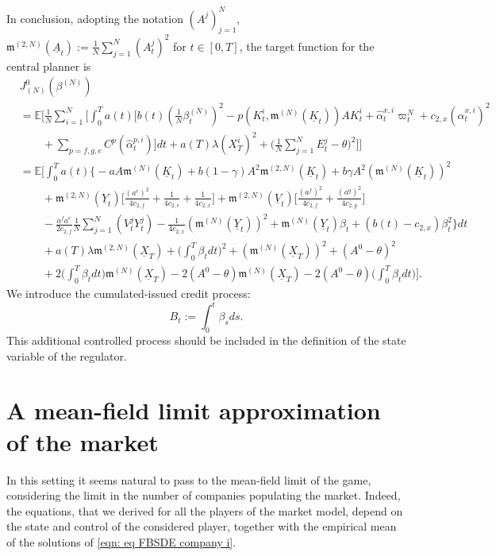 \documentclass[10pt,a4paper]{amsart}
\numberwithin{equation}{section}
\newcommand{\w}{\varpi}
\newcommand{\E}{\mathbb{E}}
\renewcommand{\hat}{\widehat}
\newcommand{\avg}{\frac{1}{N}\sum_{j = 1}^N}
\begin{document}
In conclusion, adopting the notation $(A^j)_{j= 1}^N$, $\mathfrak{m}^{(2,N)}(\underline{A}_t) := \frac{1}{N} \sum_{j =1}^N (A^j_t)^2$ for $t\in[0,T]$, the target function for the central planner is 
\begin{align*}
    &J^0_{(N)}(\beta^{(N)}) \\
    &= \E\Bigg[\frac{1}{N}\sum_{i = 1}^N \bigg[ \int_0^Ta(t)\bigg[b(t)\left(\frac{1}{N}\beta^{(N)}_t\right)^2 -p(K^i_t, \mathfrak{m}^{(N)}(\underline{K}_t)) AK^i_t + \hat\alpha^{x,i}_t \w^N_t + c_{2,x}(\hat\alpha^{x,i}_t)^2 \\
    &\qquad + \sum_{p = f,g,e}C^p(\hat\alpha^{p,i}_t)\bigg] dt + a(T)\lambda (X^i_T)^2 + \bigg( \avg E^j_t - \theta\bigg)^2\bigg] \Bigg]\\
    &= \E\bigg[ \int_0^Ta(t) \bigg\{-aA\mathfrak{m}^{(N)} (\underline{K}_t) + b(1-\gamma) A^2 \mathfrak{m}^{(2,N)}(\underline{K}_t) + b\gamma A^2 (\mathfrak{m}^{(N)}(\underline{K}_t))^2 \\
    &\qquad + \mathfrak{m}^{(2,N)}(\underline{Y}_t) \bigg[\frac{(a^e)^2}{4c_{2,f}} + \frac{1}{4c_{2,e}} + \frac{1}{4c_{2,x}}\bigg] +  \mathfrak{m}^{(2,N)}(\underline{V}_t) \bigg[\frac{(a^f)^2}{4c_{2,f}} + \frac{(a^g)^2}{4c_{2,g}}\bigg]\\
    &\qquad - \frac{a^fa^e}{2 c_{2,f}} \avg (V^j_tY^j_t) - \frac{1}{4c_{2,x}}(\mathfrak{m}^{(N)}(\underline{Y}_t))^2 + \mathfrak{m}^{(N)}(\underline{Y}_t)\beta_t +(b(t)- c_{2,x})\beta^2_t \bigg\}dt \\
    &\qquad+ a(T) \lambda \mathfrak{m}^{(2,N)}(\underline{X}_T) +\bigg(\int_0^T\beta_tdt\bigg)^2 + ( \mathfrak{m}^{(N)}(\underline{X}_T))^2 + (A^0 - \theta)^2 \\
    &\qquad+ 2\bigg(\int_0^T \beta_tdt\bigg)\mathfrak{m}^{(N)}(\underline{X}_T) - 2(A^0 - \theta) \mathfrak{m}^{(N)}(\underline{X}_T) - 2(A^0-\theta) \bigg(\int_0^T\beta_t dt\bigg)\bigg].
\end{align*}
We introduce the cumulated-issued credit process: 
\begin{equation}
    \label{eqn: process Bt}
    B_t := \int_0^t \beta_sds.
\end{equation}
This additional controlled process should be included in the definition of the state variable of the regulator. 


\section{A mean-field limit approximation of the market}
\label{section: mean field approach}
In this setting it seems natural to pass to the mean-field limit of the game, considering the limit in the number of companies populating the market. Indeed, the equations, that we derived for all the players of the market model, depend on the state and control of the considered player, together with the empirical mean of the solutions of \eqref{eqn: eq FBSDE company i}. 
\end{document}
